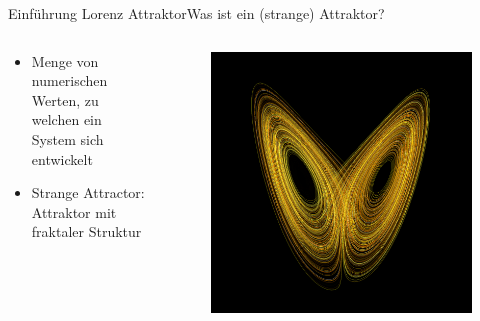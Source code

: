 \documentclass[presentation.tex]{subfiles}
\begin{document}
    \begin{frame}{Einführung Lorenz Attraktor}{Was ist ein (strange) Attraktor?}
		
		\begin{columns}[c]
			\begin{column}{.6\textwidth}
				\begin{itemize}
					\item Menge von numerischen Werten, zu welchen ein System sich entwickelt
					\item Strange Attractor: Attraktor mit fraktaler Struktur
				\end{itemize}
			\end{column}
			\begin{column}{.4\textwidth}
				\begin{figure}
					\centering
					\includegraphics[width=1\linewidth]{Attractor}
					\label{fig:Attractor}
				\end{figure}
			\end{column}
		\end{columns}
    \end{frame}
    
\end{document}
